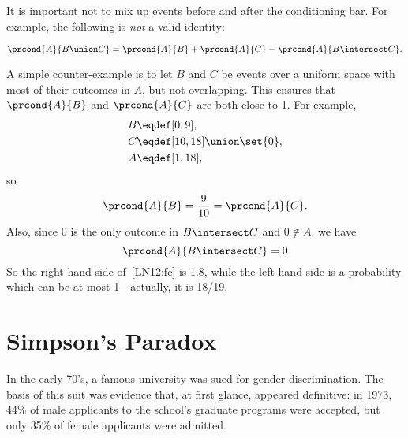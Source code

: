It is important not to mix up events before and after the conditioning
bar.  For example, the following is \emph{not} a valid identity:
%
\begin{falseclm*}
\begin{equation}\label{LN12:fc}
\prcond{A}{B \union C} = \prcond{A}{B} + \prcond{A}{C} - \prcond{A}{B \intersect C}.
\end{equation}
\end{falseclm*}

A simple counter-example is to let $B$ and $C$ be events over a
uniform space with most of their outcomes in $A$, but not overlapping.
This ensures that $\prcond{A}{B}$ and $\prcond{A}{C}$ are both close
to 1.  For example,
\begin{align*}
B & \eqdef [0,9],\\
C & \eqdef [10,18] \union \set{0},\\
A & \eqdef [1,18],
\end{align*}
so
\[
\prcond{A}{B} = \frac{9}{10} = \prcond{A}{C}.
\]
Also, since 0 is the only outcome in $B \intersect C$ and $0 \notin
A$, we have
\[
\prcond{A}{B \intersect C} = 0
\]
So the right hand side of~\eqref{LN12:fc} is 1.8, while the left hand
side is a probability which can be at most 1---actually, it is 18/19.

\iffalse

A counterexample is shown in Figure~\ref{fig:15D2}.  In this case,
$\prcond{A}{B} = 1/2$, $\prcond{A}{C} = 1/2$, $\prcond{A}{B \intersect
  C} = 1$, and $\prcond{A}{B \union C} = 1/3$.  However, since
$1/3 \ne 1/2 + 1/2 - 1$, equation~\eqref{LN12:fc} does not hold.
%
\begin{figure}

\graphic{cx19}

\caption{A counterexample to equation~\eqref{LN12:fc}.  Event~$A$ is
  the dark-bordered rectangle, event~$B$ is the rectangle with
  vertical stripes, and event~$C$ is the rectangle with horizontal
  stripes.  $B \intersect C$ lies entirely within~$A$ while $B - C$
  and $C - B$ are entirely outside of~$A$.}

\label{fig:15D2}

\end{figure}
\fi

\section{Simpson's Paradox}\label{discrimination_subsec}

In the early 70's, a famous university was sued for gender
discrimination.  The basis of this suit was evidence that, at first
glance, appeared definitive: in 1973, 44\% of male applicants to the
school's graduate programs were accepted, but only 35\% of female
applicants were admitted.

